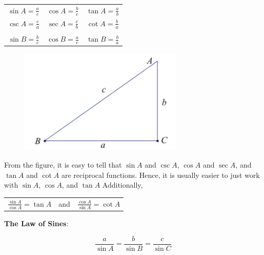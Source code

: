 \documentclass{article}
\begin{document}
            \begin{center}
                \begin{tabular}{ccc}
                    $\sin A = \frac{a}{c}$
                    & $\cos A = \frac{b}{c}$
                    & $\tan A = \frac{a}{b}$ \\
                    $\csc A = \frac{c}{a}$
                    & $\sec A = \frac{c}{b}$
                    & $\cot A = \frac{b}{a}$\\\\
                    $\sin B = \frac{b}{c}$
                    & $\cos B = \frac{a}{c}$
                    & $\tan B = \frac{b}{a}$
                \end{tabular}
            \end{center}

            \begin{figure} [h]
                \centering
                \includegraphics [scale=0.4] {Resources/Unit2Triangles/Trig.fig1.png}
            \end{figure}

            \noindent From the figure, it is easy to tell that $\sin A$ and $\csc A$, $\cos A$ and
            $\sec A$, and $\tan A$ and $\cot A$ are reciprocal functions. Hence, it is usually easier
            to just work with $\sin A$, $\cos A$, and $\tan A$ Additionally,

            \begin{center}
                \begin{tabular}{ccc}
                    $\frac{\sin A}{\cos A}=\tan A$
                    & and &
                    $\frac{\cos A}{\sin A}=\cot A$
                \end{tabular}
            \end{center}

            \noindent \color{purple} \textbf{The Law of Sines}:  \color{black}

            \begin{equation*}
                \frac{a}{\sin{A}} = \frac{b}{\sin{B}} = \frac{c}{\sin{C}}
            \end{equation*} \\
\end{document}

